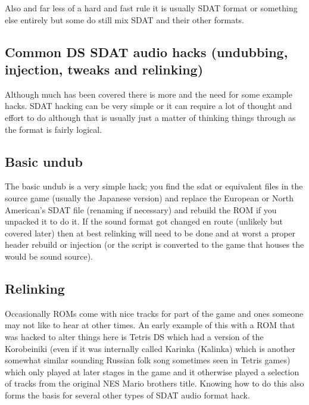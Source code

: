 \documentclass[
]{book}
\begin{document}
Also and far less of a hard and fast rule it is usually SDAT format or something else entirely but some do still mix SDAT and their other formats.

\hypertarget{common-ds-sdat-audio-hacks-undubbing-injection-tweaks-and-relinking}{%
\subsection{Common DS SDAT audio hacks (undubbing, injection, tweaks and relinking)}\label{common-ds-sdat-audio-hacks-undubbing-injection-tweaks-and-relinking}}

Although much has been covered there is more and the need for some example hacks. SDAT hacking can be very simple or it can require a lot of thought and effort to do although that is usually just a matter of thinking things through as the format is fairly logical.

\hypertarget{basic-undub}{%
\subsection{Basic undub}\label{basic-undub}}

The basic undub is a very simple hack; you find the sdat or equivalent files in the source game (usually the Japanese version) and replace the European or North American's SDAT file (renaming if necessary) and rebuild the ROM if you unpacked it to do it. If the sound format got changed en route (unlikely but covered later) then at best relinking will need to be done and at worst a proper header rebuild or injection (or the script is converted to the game that houses the would be sound source).

\hypertarget{relinking}{%
\subsection{Relinking}\label{relinking}}

Occasionally ROMs come with nice tracks for part of the game and ones someone may not like to hear at other times. An early example of this with a ROM that was hacked to alter things here is Tetris DS which had a version of the Korobeiniki (even if it was internally called Karinka (Kalinka) which is another somewhat similar sounding Russian folk song sometimes seen in Tetris games) which only played at later stages in the game and it otherwise played a selection of tracks from the original NES Mario brothers title. Knowing how to do this also forms the basis for several other types of SDAT audio format hack.
\end{document}
